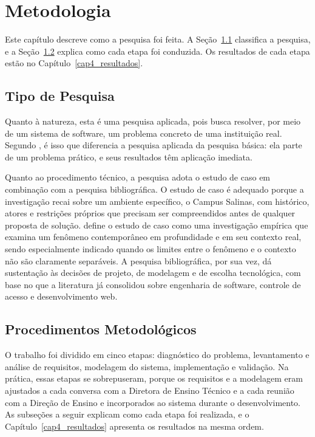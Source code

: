 \chapter{Metodologia}
\label{sec:metodologia}

Este capítulo descreve como a pesquisa foi feita. A Seção~\ref{sec:tipopesquisa} classifica a pesquisa, e a Seção~\ref{sec:procedimentos} explica como cada etapa foi conduzida. Os resultados de cada etapa estão no Capítulo~\ref{cap4_resultados}.

\section{Tipo de Pesquisa}
\label{sec:tipopesquisa}

Quanto à natureza, esta é uma pesquisa aplicada, pois busca resolver, por meio de um sistema de software, um problema concreto de uma instituição real. Segundo , é isso que diferencia a pesquisa aplicada da pesquisa básica: ela parte de um problema prático, e seus resultados têm aplicação imediata.

Quanto ao procedimento técnico, a pesquisa adota o estudo de caso em combinação com a pesquisa bibliográfica. O estudo de caso é adequado porque a investigação recai sobre um ambiente específico, o Campus Salinas, com histórico, atores e restrições próprios que precisam ser compreendidos antes de qualquer proposta de solução.  define o estudo de caso como uma investigação empírica que examina um fenômeno contemporâneo em profundidade e em seu contexto real, sendo especialmente indicado quando os limites entre o fenômeno e o contexto não são claramente separáveis. A pesquisa bibliográfica, por sua vez, dá sustentação às decisões de projeto, de modelagem e de escolha tecnológica, com base no que a literatura já consolidou sobre engenharia de software, controle de acesso e desenvolvimento web.

\section{Procedimentos Metodológicos}
\label{sec:procedimentos}

O trabalho foi dividido em cinco etapas: diagnóstico do problema, levantamento e análise de requisitos, modelagem do sistema, implementação e validação. Na prática, essas etapas se sobrepuseram, porque os requisitos e a modelagem eram ajustados a cada conversa com a Diretora de Ensino Técnico e a cada reunião com a Direção de Ensino e incorporados ao sistema durante o desenvolvimento. As subseções a seguir explicam como cada etapa foi realizada, e o Capítulo~\ref{cap4_resultados} apresenta os resultados na mesma ordem.

